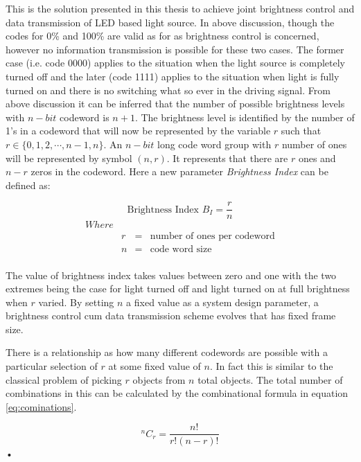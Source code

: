 This is the solution presented in this thesis to achieve joint brightness control and data transmission of LED based light source. In above discussion, though the codes for 0\% and 100\% are valid as for as brightness control is concerned, however no information transmission is possible for these two cases. The former case (i.e. code 0000) applies to the situation when the light source is completely turned off and the later (code 1111) applies to the situation when light is fully turned on and there is no switching what so ever in the driving signal. From above discussion it can be inferred that the number of possible brightness levels with $n-bit$ codeword is $n+1$. The brightness level is identified by the number of 1's in a codeword that will now be represented by the variable $r$ such that $r \in \{0,1,2,\cdots,n-1,n\}$. An $n-bit$ long code word group with $r$ number of ones will be represented by symbol $(n,r)$. It represents that there are $r$ ones and $n-r$ zeros in the codeword. Here a new parameter \emph{Brightness Index} can be defined as:

\[\text{Brightness Index   } B_I = \frac{r}{n}\]
\begin{equation}
\begin{array}{cccl}

Where&&& \\
&r&=&\text{number of ones per codeword}\\
&n&=&\text{code word size}\\
	\end{array} 
\end{equation}

The value of brightness index takes values between zero and one with the two extremes being the case for light turned off and light turned on at full brightness when $r$ varied. By setting $n$ a fixed value as a system design parameter, a brightness control cum data transmission scheme evolves that has fixed frame size.


There is a relationship as how many different codewords are possible with a particular selection of $r$ at some fixed value of $n$. In fact this is similar to the classical problem of picking $r$ objects from $n$ total objects. The total number of combinations in this can be calculated by the combinational formula in equation \ref{eq:cominations}.

\begin{equation}
^nC_r = \frac{n!}{r! (n-r)!}
\label{eq:cominations}
\end{equation}•

